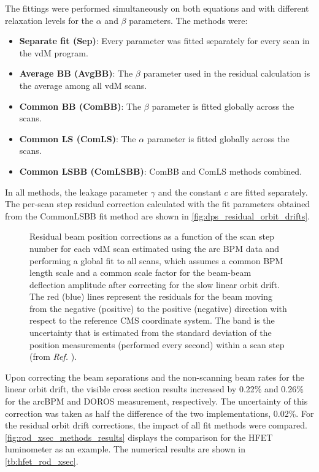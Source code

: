 \begin{itemize}
    The fittings were performed simultaneously on both equations and with different relaxation levels for the $\alpha$ and $\beta$ parameters. The methods were:
	\begin{itemize}
		\item \textbf{Separate fit (Sep)}: Every parameter was fitted separately for every scan in the vdM program.
		\item \textbf{Average BB (AvgBB)}: The $\beta$ parameter used in the residual calculation is the average among all vdM scans.
		\item \textbf{Common BB (ComBB)}: The $\beta$ parameter is fitted globally across the scans.
		\item \textbf{Common LS (ComLS)}: The $\alpha$ parameter is fitted globally across the scans.
		\item \textbf{Common LSBB (ComLSBB)}: ComBB and ComLS methods combined.
	\end{itemize}
	In all methods, the leakage parameter $\gamma$ and the constant $c$ are fitted separately. The per-scan step residual correction calculated with the fit parameters obtained from the CommonLSBB fit method are shown in \autoref{fig:dps_residual_orbit_drifts}.

	\begin{figure}[!htb]
		\centering
		\caption[Residual beam position corrections]{Residual beam position corrections as a function of the scan step number for each vdM scan estimated using the arc BPM data and performing a global fit to all scans, which assumes a common BPM length scale and a common scale factor for the beam-beam deflection amplitude after correcting for the slow linear orbit drift. The red (blue) lines represent the residuals for the beam moving from the negative (positive) to the positive (negative) direction with respect to the reference CMS coordinate system. The band is the uncertainty that is estimated from the standard deviation of the position measurements (performed every second) within a scan step (from \textit{Ref.} \cite{CMS-DP-2024-068}).}
		\label{fig:dps_residual_orbit_drifts}
	\end{figure}
\end{itemize}

Upon correcting the beam separations and the non-scanning beam rates for the linear orbit drift, the visible cross section results increased by 0.22\% and 0.26\% for the arcBPM and DOROS measurement, respectively. The uncertainty of this correction was taken as half the difference of the two implementations, 0.02\%. For the residual orbit drift corrections, the impact of all fit methods were compared. \autoref{fig:rod_xsec_methods_results} displays the comparison for the HFET luminometer as an example. The numerical results are shown in \autoref{tb:hfet_rod_xsec}.

